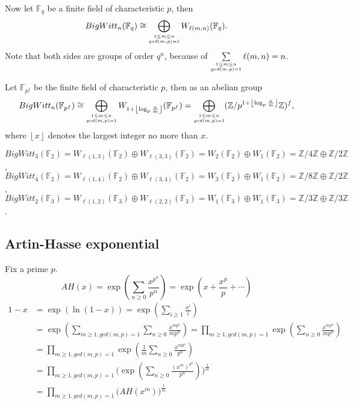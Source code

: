Now let $\mathbb{F}_q$ be a finite field of characteristic $p$, then \cite{Lauter1999A}
\[BigWitt_n(\mathbb{F}_{q}) \cong \bigoplus_{\scriptsize\substack{1\leq m\leq n \\ gcd(m,p)=1}} W_{\ell(m,n)}(\mathbb{F}_{q}).\]
Note that both sides are groups of order $q^n$, because of $\sum\limits_{\scriptsize\substack{1\leq m\leq n \\ gcd(m,p)=1}} \ell(m,n) = n$. 
\begin{corollary}
\label{cor:BW}
	Let $\mathbb{F}_{p^f}$ be the finite field of characteristic $p$, then as an abelian group
	\[
	BigWitt_n(\mathbb{F}_{p^f})\cong \bigoplus_{\scriptsize\substack{1\leq m\leq n \\ gcd(m,p)=1}}W_{1+ \left \lfloor\log_p \frac{n}{m}  \right \rfloor}(\mathbb{F}_{p^f}) = \bigoplus_{\scriptsize\substack{1\leq m\leq n \\ gcd(m,p)=1}}(\mathbb{Z}/p^{1+ \left \lfloor\log_p \frac{n}{m}  \right \rfloor}\mathbb{Z})^f,
	\]
	where $ \left \lfloor x \right \rfloor$ denotes the largest integer no more than $x$.
\end{corollary}
\begin{example}
	$BigWitt_3(\mathbb{F}_2)= W_{\ell(1,3)}(\mathbb{F}_2)\oplus W_{\ell(3,3)}(\mathbb{F}_2)=W_2(\mathbb{F}_2)\oplus W_1(\mathbb{F}_2)=\mathbb{Z}/4 \mathbb{Z}\oplus	\mathbb{Z}/2 \mathbb{Z}$, $BigWitt_4(\mathbb{F}_2)= W_{\ell(1,4)}(\mathbb{F}_2)\oplus W_{\ell(3,4)}(\mathbb{F}_2)=W_3(\mathbb{F}_2)\oplus W_1(\mathbb{F}_2)=\mathbb{Z}/8 \mathbb{Z}\oplus	\mathbb{Z}/2 \mathbb{Z}$, $BigWitt_2(\mathbb{F}_3)= W_{\ell(1,2)}(\mathbb{F}_3)\oplus W_{\ell(2,2)}(\mathbb{F}_3)=W_1(\mathbb{F}_3)\oplus W_1(\mathbb{F}_3)=\mathbb{Z}/3 \mathbb{Z}\oplus	\mathbb{Z}/3 \mathbb{Z}$. 

\end{example}

\subsection{Artin-Hasse exponential}
Fix a prime $p$.
\[AH(x)=\exp(\sum_{n\geq 0}\frac{x^{p^n}}{p^n})=\exp(x+\frac{x^p}{p}+\cdots)\]
\begin{align*}
1-x & = \exp(\ln (1-x))=\exp(\sum_{i\geq 1}\frac{x^i}{i})\\
	& = \exp(\sum_{m\geq 1,gcd(m,p)=1}\sum_{n\geq 0}\frac{x^{mp^n}}{mp^n})=\prod_{m\geq 1,gcd(m,p)=1}\exp(\sum_{n\geq 0}\frac{x^{mp^n}}{mp^n})\\
	& = \prod_{m\geq 1,gcd(m,p)=1}\exp(\frac{1}{m}\sum_{n\geq 0}\frac{x^{mp^n}}{p^n})\\
	& = \prod_{m\geq 1,gcd(m,p)=1}\big(\exp(\sum_{n\geq 0}\frac{(x^m)^{p^n}}{p^n})\big)^{\frac{1}{m}}\\
	& = \prod_{m\geq 1,gcd(m,p)=1}\big(AH(x^m)\big)^{\frac{1}{m}}
\end{align*}

